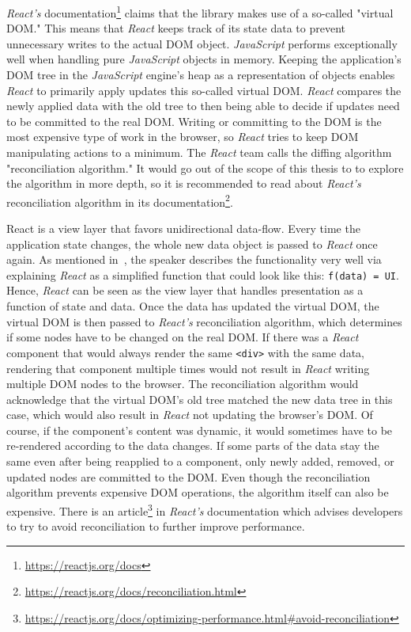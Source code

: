 \emph{React's} documentation\footnote{\url{https://reactjs.org/docs}} claims that the library makes use of a so-called "virtual DOM." This means that \emph{React} keeps track of its state data to prevent unnecessary writes to the actual DOM object. \emph{JavaScript} performs exceptionally well when handling pure \emph{JavaScript} objects in memory. Keeping the application's DOM tree in the \emph{JavaScript} engine's heap as a representation of objects enables \emph{React} to primarily apply updates this so-called virtual DOM. \emph{React} compares the newly applied data with the old tree to then being able to decide if updates need to be committed to the real DOM. Writing or committing to the DOM is the most expensive type of work in the browser, so \emph{React} tries to keep DOM manipulating actions to a minimum. The \emph{React} team calls the diffing algorithm "reconciliation algorithm." It would go out of the scope of this thesis to to explore the algorithm in more depth, so it is recommended to read about \emph{React's} reconciliation algorithm in its documentation\footnote{\url{https://reactjs.org/docs/reconciliation.html}}.

React is a view layer that favors unidirectional data-flow. Every time the application state changes, the whole new data object is passed to \emph{React} once again. As mentioned in~\cite[6:50]{ReactFoundingVideo}, the speaker describes the functionality very well via explaining \emph{React} as a simplified function that could look like this: \texttt{f(data) = UI}. Hence, \emph{React} can be seen as the view layer that handles presentation as a function of state and data. Once the data has updated the virtual DOM, the virtual DOM is then passed to \emph{React's} reconciliation algorithm, which determines if some nodes have to be changed on the real DOM. If there was a \emph{React} component that would always render the same \texttt{<div>} with the same data, rendering that component multiple times would not result in \emph{React} writing multiple DOM nodes to the browser. The reconciliation algorithm would acknowledge that the virtual DOM's old tree matched the new data tree in this case, which would also result in \emph{React} not updating the browser's DOM. Of course, if the component's content was dynamic, it would sometimes have to be re-rendered according to the data changes. If some parts of the data stay the same even after being reapplied to a component, only newly added, removed, or updated nodes are committed to the DOM. Even though the reconciliation algorithm prevents expensive DOM operations, the algorithm itself can also be expensive. There is an article\footnote{\url{https://reactjs.org/docs/optimizing-performance.html\#avoid-reconciliation}} in \emph{React's} documentation which advises developers to try to avoid reconciliation to further improve performance.

